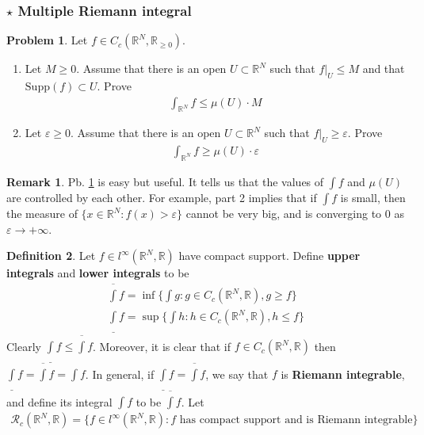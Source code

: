 \documentclass[12pt,b5paper,notitlepage]{article}
\theoremstyle{definition}
\newtheorem{df}{Definition}[section]
\newtheorem{rem}[df]{Remark}
\newtheorem{prob}{\color{red}Problem}[section]
\theoremstyle{plain}
\newcommand{\ovl}{\overline}
\newcommand{\udl}{\underline}
\newcommand{\scr}{\mathscr}
\newcommand{\Rbb}{\mathbb R}
\newcommand{\Supp}{\mathrm{Supp}}
\newcommand{\eps}{\varepsilon}
\numberwithin{equation}{section}
\begin{document}
\subsubsection{$\star$ Multiple Riemann integral}\label{lb534}

\begin{prob}\label{lb488}
Let $f\in C_c(\Rbb^N,\Rbb_{\geq0})$.
\begin{enumerate}
\item Let $M\geq0$. Assume that there is an open $U\subset\Rbb^N$ such that $f|_U\leq M$ and that $\Supp(f)\subset U$. Prove
\begin{align*}
\int_{\Rbb^N}f\leq\mu(U)\cdot M
\end{align*}
\item Let $\eps\geq0$. Assume that there is an open $U\subset\Rbb^N$ such that $f|_U\geq\eps$. Prove
\begin{align*}
\int_{\Rbb^N}f\geq\mu(U)\cdot \eps
\end{align*}
\end{enumerate}
\end{prob}


\begin{rem}
Pb. \ref{lb488} is easy but useful. It tells us that the values of $\int f$ and $\mu(U)$ are controlled by each other. For example, part 2 implies that if $\int f$ is small, then the measure of $\{x\in\Rbb^N:f(x)>\eps\}$ cannot be very big, and is converging to $0$ as $\eps\rightarrow+\infty$. 
\end{rem}


\begin{df}
Let $f\in l^\infty(\Rbb^N,\Rbb)$ have compact support. Define \textbf{upper integrals} and \textbf{lower integrals} to be
\begin{gather*}
\ovl\int f=\inf\Big\{\int g:g\in C_c(\Rbb^N,\Rbb),g\geq f  \Big\}\\
\underline\int f=\sup\Big\{\int h:h\in C_c(\Rbb^N,\Rbb),h\leq f  \Big\}
\end{gather*}
Clearly $\udl\int f\leq\ovl\int f$. Moreover, it is clear that if $f\in C_c(\Rbb^N,\Rbb)$ then $\udl\int f=\ovl\int f=\int f$. In general, if $\udl\int f=\ovl\int f$, we say that $f$ is \textbf{Riemann integrable},  and define its integral $\int f$ to be $\ovl\int f$. Let \index{Rc@$\scr R_c(\Rbb^N,\Rbb)$}
\begin{align*}
\scr R_c(\Rbb^N,\Rbb)=\{f\in l^\infty(\Rbb^N,\Rbb):f\text{ has compact support and is Riemann integrable}\}
\end{align*}
\end{df}
\end{document}
